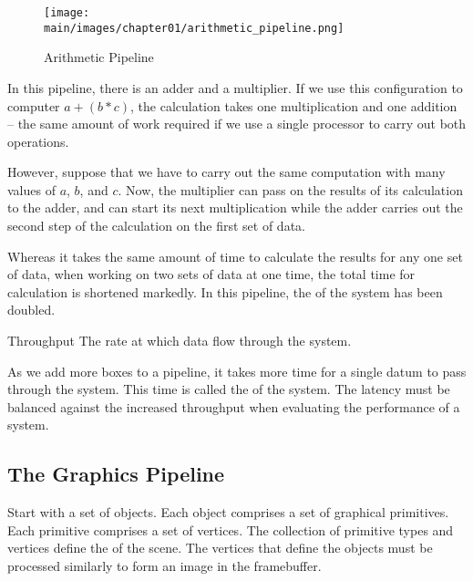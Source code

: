 \documentclass[../COS3712_Notes.tex]{subfiles}
\begin{document}
        \begin{example}
          \begin{wrapfigure}{r}{0.5\textwidth}
            \begin{center}
              \texttt{[image: \\main/images/chapter01/arithmetic\_pipeline.png]}
            \end{center}
            \caption{Arithmetic Pipeline}
          \end{wrapfigure}
          In this pipeline, there is an adder and a multiplier.
          If we use this configuration to computer $a + (b * c)$,
          the calculation takes one multiplication and one addition
          -- the same amount of work required if we use a single processor
          to carry out both operations.

          However, suppose that we have to carry out the same computation
          with many values of $a$, $b$, and $c$.
          Now, the multiplier can pass on the results of its calculation
          to the adder,
          and can start its next multiplication
          while the adder carries out the second step of the calculation
          on the first set of data.

          Whereas it takes the same amount of time to calculate the results
          for any one set of data,
          when working on two sets of data at one time,
          the total time for calculation is shortened markedly.
          In this pipeline, the  of the system
          has been doubled.
        \end{example}

        \begin{definition}{Throughput}
          The rate at which data flow through the system.
        \end{definition}

        As we add more boxes to a pipeline,
        it takes more time for a single datum to pass through the system.
        This time is called the  of the system.
        The latency must be balanced against the increased throughput
        when evaluating the performance of a system.

      \subsection{The Graphics Pipeline}
        Start with a set of objects.
        Each object comprises a set of graphical primitives.
        Each primitive comprises a set of vertices.
        The collection of primitive types and vertices define
        the  of the scene.
        The vertices that define the objects
        must be processed similarly to form an image in the framebuffer.
\end{document}
